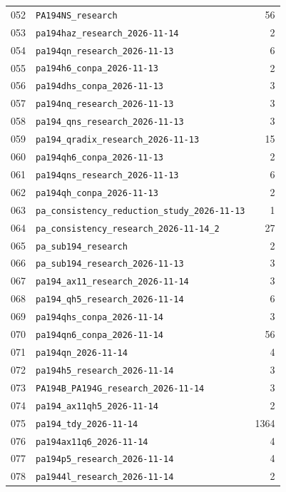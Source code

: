 \begin{longtable}{rL{124mm}r}
052 & \nolinkurl{PA194NS_research} & 56\\[0.5pt]
053 & \nolinkurl{pa194haz_research_2026-11-14} & 2\\[0.5pt]
054 & \nolinkurl{pa194qn_research_2026-11-13} & 6\\[0.5pt]
055 & \nolinkurl{pa194h6_conpa_2026-11-13} & 2\\[0.5pt]
056 & \nolinkurl{pa194dhs_conpa_2026-11-13} & 3\\[0.5pt]
057 & \nolinkurl{pa194nq_research_2026-11-13} & 3\\[0.5pt]
058 & \nolinkurl{pa194_qns_research_2026-11-13} & 3\\[0.5pt]
059 & \nolinkurl{pa194_qradix_research_2026-11-13} & 15\\[0.5pt]
060 & \nolinkurl{pa194qh6_conpa_2026-11-13} & 2\\[0.5pt]
061 & \nolinkurl{pa194qns_research_2026-11-13} & 6\\[0.5pt]
062 & \nolinkurl{pa194qh_conpa_2026-11-13} & 2\\[0.5pt]
063 & \nolinkurl{pa_consistency_reduction_study_2026-11-13} & 1\\[0.5pt]
064 & \nolinkurl{pa_consistency_research_2026-11-14_2} & 27\\[0.5pt]
065 & \nolinkurl{pa_sub194_research} & 2\\[0.5pt]
066 & \nolinkurl{pa_sub194_research_2026-11-13} & 3\\[0.5pt]
067 & \nolinkurl{pa194_ax11_research_2026-11-14} & 3\\[0.5pt]
068 & \nolinkurl{pa194_qh5_research_2026-11-14} & 6\\[0.5pt]
069 & \nolinkurl{pa194qhs_conpa_2026-11-14} & 3\\[0.5pt]
070 & \nolinkurl{pa194qn6_conpa_2026-11-14} & 56\\[0.5pt]
071 & \nolinkurl{pa194qn_2026-11-14} & 4\\[0.5pt]
072 & \nolinkurl{pa194h5_research_2026-11-14} & 3\\[0.5pt]
073 & \nolinkurl{PA194B_PA194G_research_2026-11-14} & 3\\[0.5pt]
074 & \nolinkurl{pa194_ax11qh5_2026-11-14} & 2\\[0.5pt]
075 & \nolinkurl{pa194_tdy_2026-11-14} & 1364\\[0.5pt]
076 & \nolinkurl{pa194ax11q6_2026-11-14} & 4\\[0.5pt]
077 & \nolinkurl{pa194p5_research_2026-11-14} & 4\\[0.5pt]
078 & \nolinkurl{pa1944l_research_2026-11-14} & 2\\[0.5pt]

\end{longtable}
